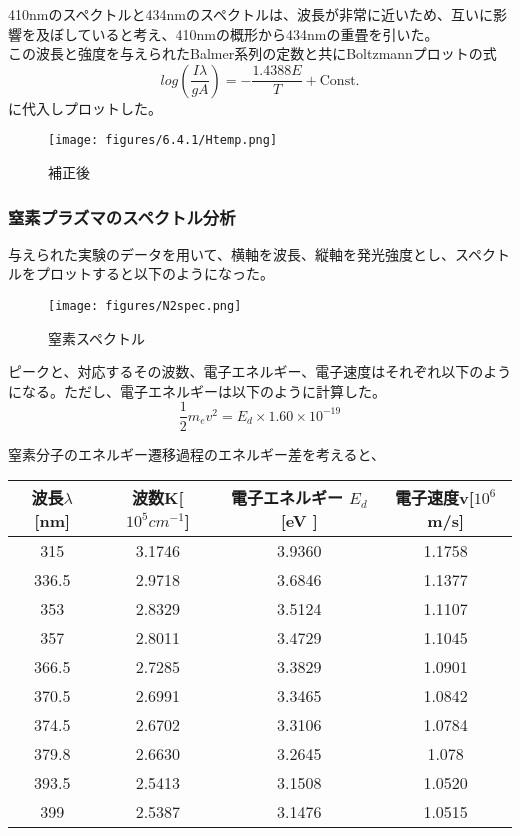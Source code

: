 \documentclass{ltjsarticle}
\begin{document}
410nmのスペクトルと434nmのスペクトルは、波長が非常に近いため、互いに影響を及ぼしていると考え、410nmの概形から434nmの重畳を引いた。\\
この波長と強度を与えられたBalmer系列の定数と共にBoltzmannプロットの式
\[
    log\left(\frac{I\lambda}{gA}\right) = - \frac{1.4388E}{T} + \mbox{Const.}
\]
に代入しプロットした。

\begin{figure}[H]
    \begin{center}
        \texttt{[image: figures/6.4.1/Htemp.png]}
        \caption{補正後}
    \end{center}
\end{figure}


\subsubsection{窒素プラズマのスペクトル分析}
与えられた実験のデータを用いて、横軸を波長、縦軸を発光強度とし、スペクトルをプロットすると以下のようになった。

\begin{figure}[H]
    \begin{center}
        \texttt{[image: figures/N2spec.png]}
        \caption{窒素スペクトル}
    \end{center}
\end{figure}

ピークと、対応するその波数、電子エネルギー、電子速度はそれぞれ以下のようになる。ただし、電子エネルギーは以下のように計算した。\\

\[
    \frac{1}{2}m_ev^2 = E_d \times 1.60 \times 10^{-19}
\]

窒素分子のエネルギー遷移過程のエネルギー差を考えると、
\begin{table}[H]
    \begin{center}
        \begin{tabular}{|c|c|c|c|} \hline
            波長$\lambda$ [nm] & 波数K[$10^5cm^{-1}$] & 電子エネルギー $E_d$[eV
            ] & 電子速度v[$10^6$m/s]\\ \hline
            315 & 3.1746 & 3.9360 & 1.1758\\ \hline
            336.5 & 2.9718 & 3.6846 & 1.1377 \\ \hline
            353 & 2.8329 & 3.5124 & 1.1107 \\ \hline
            357 & 2.8011 & 3.4729 & 1.1045 \\ \hline
            366.5 & 2.7285 & 3.3829 & 1.0901  \\ \hline
            370.5 & 2.6991 & 3.3465  & 1.0842 \\ \hline
            374.5 & 2.6702 & 3.3106 & 1.0784 \\ \hline
            379.8 & 2.6630 & 3.2645 & 1.078 \\ \hline
            393.5 & 2.5413 & 3.1508 & 1.0520 \\ \hline
            399 & 2.5387 & 3.1476 & 1.0515 \\ \hline
        \end{tabular}
    \end{center}
\end{table}
\end{document}
